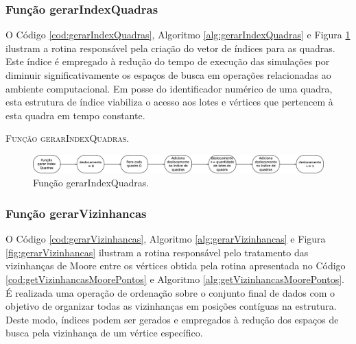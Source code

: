 \subsubsection{Função gerarIndexQuadras}

O Código \ref{cod:gerarIndexQuadras}, Algoritmo \ref{alg:gerarIndexQuadras} e Figura \ref{fig:gerarIndexQuadras} ilustram a rotina responsável pela criação do vetor de índices para as quadras. Este índice é empregado à redução do tempo de execução das simulações por diminuir significativamente os espaços de busca em operações relacionadas ao ambiente computacional. Em posse do identificador numérico de uma quadra, esta estrutura de índice viabiliza o acesso aos lotes e vértices que pertencem à esta quadra em tempo constante. 



\begin{algorithm}[H]
   \SetAlgoLined   
   
   \caption{\textsc{Função gerarIndexQuadras.}}
   \label{alg:gerarIndexQuadras}
\end{algorithm}

\begin{figure}[H]
  \centering
  \includegraphics[width=1\textwidth]{Figuras/Simula/Fluxos/gerarIndexQuadras.eps}
  \caption{Função gerarIndexQuadras.}
  \label{fig:gerarIndexQuadras}
\end{figure} 

\newpage

\subsubsection{Função gerarVizinhancas}

O Código \ref{cod:gerarVizinhancas}, Algoritmo \ref{alg:gerarVizinhancas} e Figura \ref{fig:gerarVizinhancas} ilustram a rotina responsável pelo tratamento das vizinhanças de Moore entre os vértices obtida pela rotina apresentada no Código \ref{cod:getVizinhancasMoorePontos} e Algoritmo \ref{alg:getVizinhancasMoorePontos}. É realizada uma operação de ordenação sobre o conjunto final de dados com o objetivo de organizar todas as vizinhanças em posições contíguas na estrutura. Deste modo, índices podem ser gerados e empregados à redução dos espaços de busca pela vizinhança de um vértice específico. 


